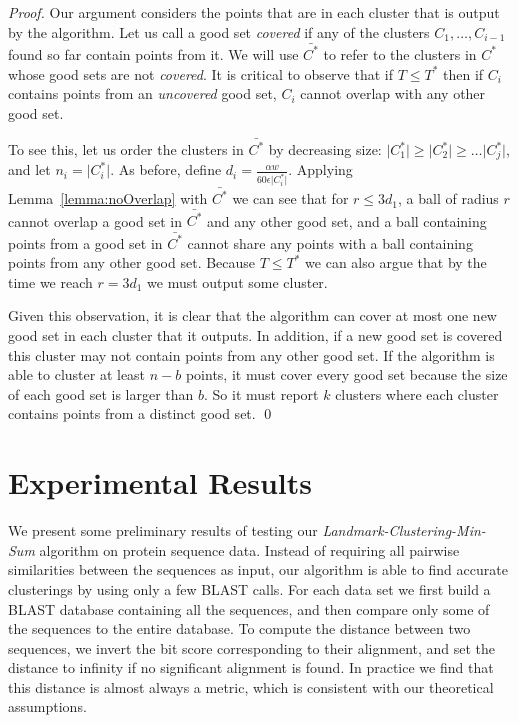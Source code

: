 \documentclass{llncs} \usepackage{algorithm}
\begin{document}
\begin{proof}
Our argument considers the points that are in each cluster that is output by the algorithm.  Let us call a good set \emph{covered} if any of the clusters $C_{1},\ldots, C_{i-1}$ found so far contain points from it.  We will use $\bar{C^{\ast}}$ to refer to the clusters in $C^{\ast}$ whose good sets are not \emph{covered}. It is critical to observe that if $T \le T^{\ast}$ then if $C_{i}$ contains points from an \emph{uncovered} good set, $C_{i}$ cannot overlap with any other good set.

To see this, let us order the clusters in $\bar{C^{\ast}}$ by decreasing size: $\vert C_{1}^{\ast} \vert \ge \vert C_{2}^{\ast} \vert \ge \ldots \vert C_{j}^{\ast} \vert$, and let $n_{i} = \vert C_{i}^{\ast} \vert$.  As before, define $d_{i} = \frac{\alpha w}{60 \epsilon \vert C_{i}^{\ast} \vert}$. Applying Lemma~\ref{lemma:noOverlap} with $\bar{C^{\ast}}$ we can see that for $r \le 3d_{1}$, a ball of radius $r$ cannot overlap a good set in $\bar{C^{\ast}}$ and any other good set, and a ball containing points from a good set in $\bar{C^{\ast}}$ cannot share any points with a ball containing points from any other good set.  Because $T \le T^{\ast}$ we can also argue that by the time we reach $r=3d_{1}$ we must output some cluster.

Given this observation, it is clear that the algorithm can cover at most one new good set in each cluster that it outputs.  In addition, if a new good set is covered this cluster may not contain points from any other good set. If the algorithm is able to cluster at least $n-b$ points, it must cover every good set because the size of each good set is larger than $b$.  So it must report $k$ clusters where each cluster contains points from a distinct good set. \qed

\end{proof}

\section{Experimental Results}

We present some preliminary results of testing our \emph{Landmark-Clustering-Min-Sum} algorithm on protein sequence data.  Instead of requiring all pairwise similarities between the sequences as input, our algorithm is able to find accurate clusterings by using only a few BLAST calls.  For each data set we first build a BLAST database containing all the sequences, and then compare only some of the sequences to the entire database.  To compute the distance between two sequences, we invert the bit score corresponding to their alignment, and set the distance to infinity if no significant alignment is found.  In practice we find that this distance is almost always a metric, which is consistent with our theoretical assumptions.
\end{document}
